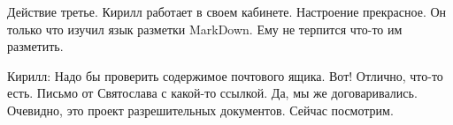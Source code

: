 Действие третье.
Кирилл работает в своем кабинете. Настроение прекрасное. Он только что изучил язык разметки
MarkDown. Ему не терпится что-то им разметить. 

Кирилл: Надо бы проверить содержимое почтового ящика. Вот! Отлично, что-то есть. 
Письмо от Святослава с какой-то ссылкой. Да, мы же договаривались. Очевидно, это проект
разрешительных документов. Сейчас посмотрим.
